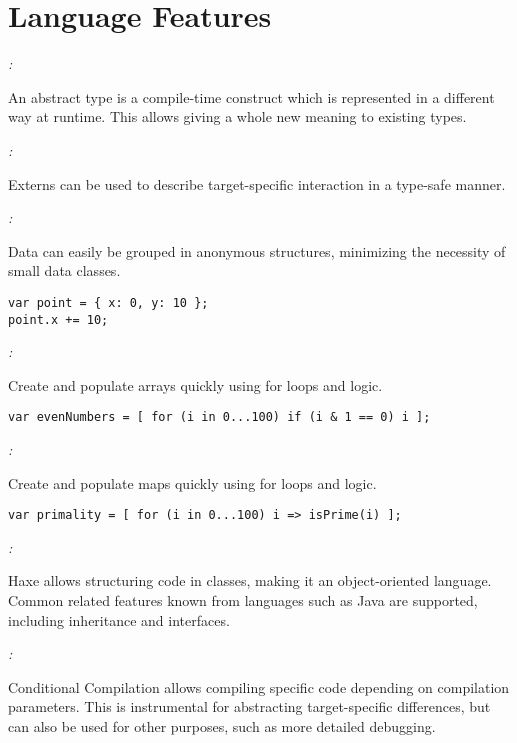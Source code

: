 \chapter{Language Features}
\label{lf}

\emph{:}

An abstract type is a compile-time construct which is represented in a different way at runtime. This allows giving a whole new meaning to existing types.

\emph{:}

Externs can be used to describe target-specific interaction in a type-safe manner.

\emph{:}

Data can easily be grouped in anonymous structures, minimizing the necessity of small data classes.

\begin{lstlisting}
var point = { x: 0, y: 10 };
point.x += 10;
\end{lstlisting}

\emph{:}

Create and populate arrays quickly using for loops and logic.

\begin{lstlisting}
var evenNumbers = [ for (i in 0...100) if (i & 1 == 0) i ];
\end{lstlisting}

\emph{:}

Create and populate maps quickly using for loops and logic.

\begin{lstlisting}
var primality = [ for (i in 0...100) i => isPrime(i) ];
\end{lstlisting}

\emph{:}

Haxe allows structuring code in classes, making it an object-oriented language. Common related features known from languages such as Java are supported, including inheritance and interfaces.

\emph{:}

Conditional Compilation allows compiling specific code depending on compilation parameters. This is instrumental for abstracting target-specific differences, but can also be used for other purposes, such as more detailed debugging.

